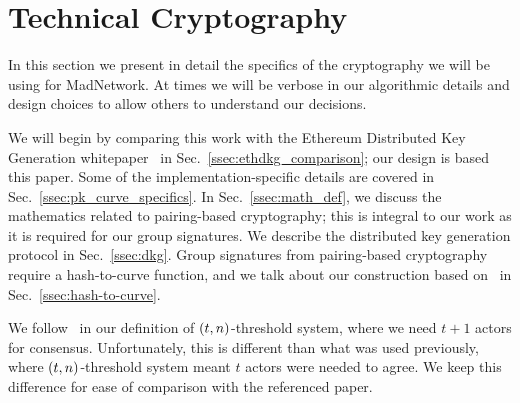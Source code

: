 \section{Technical Cryptography}
\label{sec:tech_crypto}

In this section we present in detail the specifics of the
cryptography we will be using for MadNetwork.
At times we will be verbose in our algorithmic details
and design choices to allow others to understand our decisions.

We will begin by comparing this work with the
Ethereum Distributed Key Generation whitepaper~\cite{ethdkg}
in Sec.~\ref{ssec:ethdkg_comparison};
our design is based this paper.
Some of the implementation-specific details are covered in
Sec.~\ref{ssec:pk_curve_specifics}.
In Sec.~\ref{ssec:math_def}, we discuss the mathematics
related to pairing-based cryptography; this is integral to
our work as it is required for our group signatures.
We describe the distributed key generation protocol in
Sec.~\ref{ssec:dkg}.
Group signatures from pairing-based cryptography require
a hash-to-curve function, and we talk about our construction
based on~\cite{ft2012bnhashtocurve,boneh2019h2cBLS12}
in Sec.~\ref{ssec:hash-to-curve}.

We follow~\cite{ethdkg} in our definition of
$\left( t,n \right)$-threshold system, where we need $t+1$ actors
for consensus.
Unfortunately, this is different than what was used previously,
where $\left( t,n \right)$-threshold system meant $t$ actors were
needed to agree.
We keep this difference for ease of comparison with the referenced paper.






